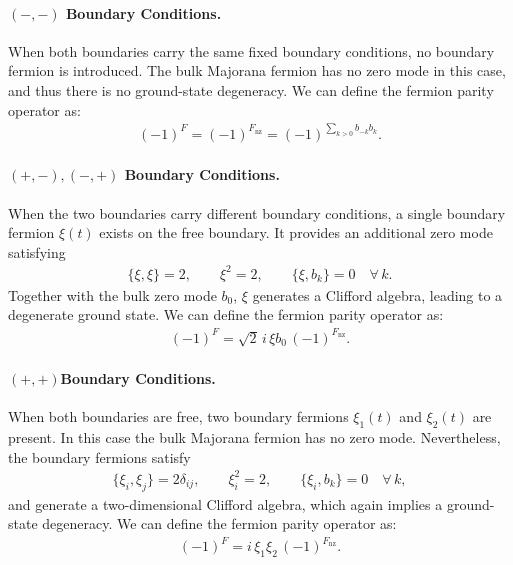 \paragraph{$ (-,-) $ Boundary Conditions.}
When both boundaries carry the same fixed boundary conditions, no boundary fermion is introduced. The bulk Majorana fermion has no zero mode in this case, and thus there is no ground-state degeneracy. We can define the fermion parity operator as:
\begin{align}
  (-1)^F = (-1)^{F_{\mathrm{nz}}}
  = (-1)^{\sum_{k>0} b_{-k} b_k} .
\end{align}

\paragraph{$ (+,-),(-,+) $ Boundary Conditions.}
When the two boundaries carry different boundary conditions, a single boundary fermion $\xi(t)$ exists on the free boundary. It provides an additional zero mode satisfying
\begin{align}
  \{ \xi, \xi \} = 2 , \qquad \xi^2 = 2 , \qquad \{ \xi, b_k \} = 0 \quad \forall\, k .
\end{align}
Together with the bulk zero mode $b_0$, $\xi$ generates a Clifford algebra, leading to a degenerate ground state. We can define the fermion parity operator as:
\begin{align}
  (-1)^F = \sqrt{2}\, i\, \xi b_0\, (-1)^{F_{\mathrm{nz}}} .
\end{align}


\paragraph{$ (+,+) $Boundary Conditions.}
When both boundaries are free, two boundary fermions $\xi_1(t)$ and $\xi_2(t)$ are present. In this case the bulk Majorana fermion has no zero mode. Nevertheless, the boundary fermions satisfy
\begin{align}
  \{ \xi_i, \xi_j \} = 2\delta_{ij}, \qquad \xi_i^2 = 2 , \qquad \{ \xi_i, b_k \} = 0 \quad \forall\, k ,
\end{align}
and generate a two-dimensional Clifford algebra, which again implies a ground-state degeneracy. We can define the fermion parity operator as:
\begin{align}
  (-1)^F = i\, \xi_1 \xi_2\, (-1)^{F_{\mathrm{nz}}} .
\end{align}
 

